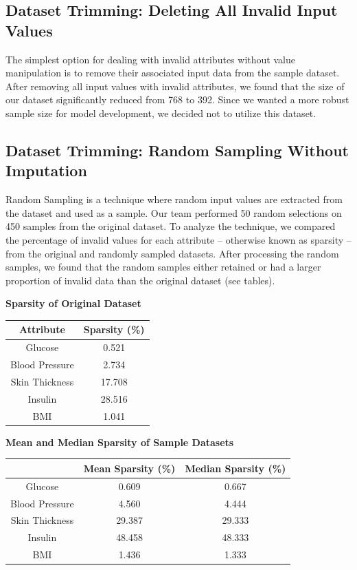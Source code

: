 \documentclass[journal]{IEEEtran}
\begin{document}
\subsection{Dataset Trimming: Deleting All Invalid Input Values}

The simplest option for dealing with invalid attributes without value manipulation is to remove their associated input data from the sample dataset. After removing all input values with invalid attributes, we found that the size of our dataset significantly reduced from 768 to 392. Since we wanted a more robust sample size for model development, we decided not to utilize this dataset.

\subsection{Dataset Trimming: Random Sampling Without Imputation}

Random Sampling is a technique where random input values are extracted from the dataset and used as a sample. Our team performed 50 random selections on 450 samples from the original dataset. To analyze the technique, we compared the percentage of invalid values for each attribute -- otherwise known as sparsity -- from the original and randomly sampled datasets. After processing the random samples, we found that the random samples either retained or had a larger proportion of invalid data than the original dataset (see tables).

\begin{center}
    \textbf{Sparsity of Original Dataset}
    \begin{tabular}{|c|c|}
        \hline
        Attribute & Sparsity (\%) \\
        \hline
        Glucose & 0.521 \\
        \hline
        Blood Pressure & 2.734 \\
        \hline
        Skin Thickness & 17.708 \\
        \hline
        Insulin & 28.516 \\
        \hline
        BMI & 1.041 \\
        \hline
    \end{tabular}
\end{center}

\begin{center}
    \textbf{Mean and Median Sparsity of Sample Datasets}
    \begin{tabular}{|c|c|c|}
        \hline
        & Mean Sparsity (\%) & Median Sparsity (\%) \\
        \hline
        Glucose & 0.609 & 0.667 \\
        \hline
        Blood Pressure & 4.560 & 4.444 \\
        \hline
        Skin Thickness & 29.387 & 29.333 \\
        \hline
        Insulin & 48.458 & 48.333 \\
        \hline
        BMI & 1.436 & 1.333 \\
        \hline
    \end{tabular} \\
\end{center}
\end{document}
